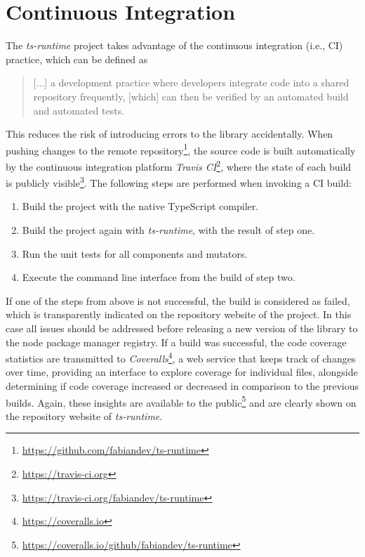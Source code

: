 \section{Continuous Integration}
\label{sec:continuous-integration}

The \emph{ts-runtime} project takes advantage of the continuous integration (i.e., CI) practice, which can be defined as
\begin{quote}
  [...] a development practice where developers integrate code into a shared repository frequently, [which] can then be verified by an automated build and automated tests.~\cite{ContinuousIntegration:Codeship}%
\end{quote}
This reduces the risk of introducing errors to the library accidentally. When pushing changes to the remote repository\footnote{\url{https://github.com/fabiandev/ts-runtime}}, the source code is built automatically by the continuous integration platform \emph{Travis CI}\footnote{\url{https://travis-ci.org}}, where the state of each build is publicly visible\footnote{\url{https://travis-ci.org/fabiandev/ts-runtime}}. The following steps are performed when invoking a CI build:
\begin{enumerate}
  \item Build the project with the native TypeScript compiler.
  \item Build the project again with \emph{ts-runtime}, with the result of step one.
  \item Run the unit tests for all components and mutators.
  \item Execute the command line interface from the build of step two.
\end{enumerate}
If one of the steps from above is not successful, the build is considered as failed, which is transparently indicated on the repository website of the project. In this case all issues should be addressed before releasing a new version of the library to the node package manager registry. If a build was successful, the code coverage statistics are transmitted to \emph{Coveralls}\footnote{\url{https://coveralls.io}}, a web service that keeps track of changes over time, providing an interface to explore coverage for individual files, alongside determining if code coverage increased or decreased in comparison to the previous builds. Again, these insights are available to the public\footnote{\url{https://coveralls.io/github/fabiandev/ts-runtime}} and are clearly shown on the repository website of \emph{ts-runtime}.

